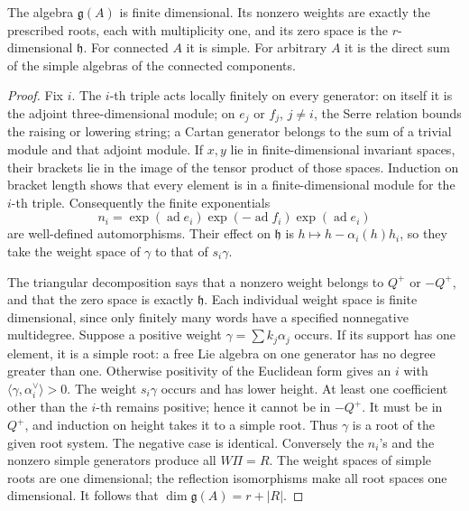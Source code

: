 \begin{theorem}
\label{res:F03}
The algebra \(\mathfrak g(A)\) is finite dimensional. Its nonzero
weights are exactly the prescribed roots, each with multiplicity
one, and its zero space is the \(r\)-dimensional \(\mathfrak h\).
For connected \(A\) it is simple. For arbitrary \(A\) it is
the direct sum of the simple algebras of the connected components.
\end{theorem}
\begin{proof}
Fix \(i\). The \(i\)-th triple acts locally finitely on every
generator: on itself it is the adjoint three-dimensional module;
on \(e_j\) or \(f_j\), \(j\ne i\), the Serre relation bounds
the raising or lowering string; a Cartan generator belongs
to the sum of a trivial module and that adjoint module.
If \(x,y\) lie in finite-dimensional invariant spaces, their
brackets lie in the image of the tensor product of those
spaces. Induction on bracket length shows that every element
is in a finite-dimensional module for the \(i\)-th triple.
Consequently the finite exponentials
\[
 n_i=\exp(\operatorname{ad}e_i)
       \exp(-\operatorname{ad}f_i)
       \exp(\operatorname{ad}e_i)
\]
are well-defined automorphisms. Their effect on \(\mathfrak h\)
is \(h\mapsto h-\alpha_i(h)h_i\), so they take the weight
space of \(\gamma\) to that of \(s_i\gamma\).

The triangular decomposition says that a nonzero weight
belongs to \(Q^+\) or \(-Q^+\), and that the zero space is
exactly \(\mathfrak h\). Each individual weight space is
finite dimensional, since only finitely many words have
a specified nonnegative multidegree. Suppose a positive
weight \(\gamma=\sum k_j\alpha_j\) occurs.
If its support has one element, it is a simple root:
a free Lie algebra on one generator has no degree greater
than one. Otherwise positivity of the Euclidean form gives
an \(i\) with \(\langle\gamma,\alpha_i^\vee\rangle>0\).
The weight \(s_i\gamma\) occurs and has lower height.
At least one coefficient other than the \(i\)-th remains
positive; hence it cannot be in \(-Q^+\).
It must be in \(Q^+\), and induction on height takes it
to a simple root. Thus \(\gamma\) is a root of the
given root system. The negative case is identical.
Conversely the \(n_i\)'s and the nonzero simple generators
produce all \(W\Pi=R\).
The weight spaces of simple roots are one dimensional;
the reflection isomorphisms make all root spaces
one dimensional. It follows that
\(\dim\mathfrak g(A)=r+|R|\).


\end{proof}
